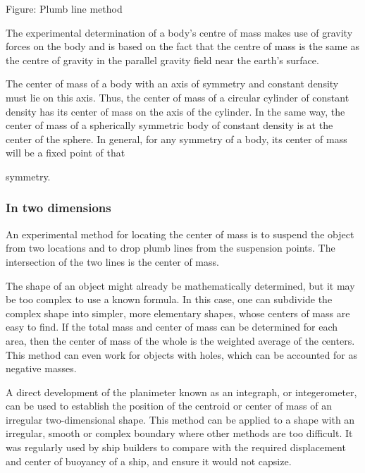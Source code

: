 Figure: Plumb line method


The experimental determination of a body's centre of mass makes use of gravity forces on the body and is based on the fact that the centre of mass is the same as the centre of gravity in the parallel gravity field near the earth's surface.


The center of mass of a body with an axis of symmetry and constant density must lie on this axis. Thus, the center of mass of a circular cylinder of constant density has its center of mass on the axis of the cylinder. In the same way, the center of mass of a spherically symmetric body of constant density is at the center of the sphere. In general, for any symmetry of a body, its center of mass will be a fixed point of that

symmetry.


\subsubsection{In two dimensions}
\label{sss:intw-f157}


An experimental method for locating the center of mass is to suspend the object from two locations and to drop plumb lines from the suspension points. The intersection of the two lines is the center of mass.


The shape of an object might already be mathematically determined, but it may be too complex to use a known formula. In this case, one can subdivide the complex shape into simpler, more elementary shapes, whose centers of mass are easy to find. If the total mass and center of mass can be determined for each area, then the center of mass of the whole is the weighted average of the centers. This method can even work for objects with holes, which can be accounted for as negative masses.


A direct development of the planimeter known as an integraph, or integerometer, can be used to establish the position of the centroid or center of mass of an irregular two-dimensional shape. This method can be applied to a shape with an irregular, smooth or complex boundary where other methods are too difficult. It was regularly used by ship builders to compare with the required displacement and center of buoyancy of a ship, and ensure it would not capsize.


